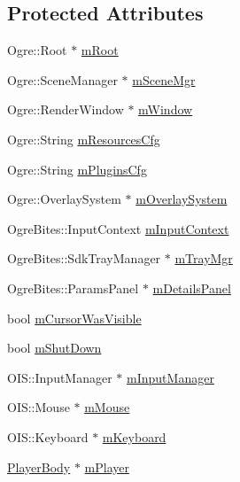 \subsection*{\-Protected \-Attributes}
\begin{DoxyCompactItemize}
\item 
\-Ogre\-::\-Root $\ast$ \hyperlink{classBaseApplication_add84ba707dc6c57e6283f214b1274110}{m\-Root}
\item 
\-Ogre\-::\-Scene\-Manager $\ast$ \hyperlink{classBaseApplication_a8a7684f4f9a57ed3089048ad1a913b2d}{m\-Scene\-Mgr}
\item 
\-Ogre\-::\-Render\-Window $\ast$ \hyperlink{classBaseApplication_ac5d8e9c81e036897bc82f81eff8c570f}{m\-Window}
\item 
\-Ogre\-::\-String \hyperlink{classBaseApplication_a765e0df01c141a16df3178ab4f17afe6}{m\-Resources\-Cfg}
\item 
\-Ogre\-::\-String \hyperlink{classBaseApplication_a04f2fe47fa164fd78d986dc0df70b7fb}{m\-Plugins\-Cfg}
\item 
\-Ogre\-::\-Overlay\-System $\ast$ \hyperlink{classBaseApplication_a17ccdacc654eff8ac0d09f025311fbb5}{m\-Overlay\-System}
\item 
\-Ogre\-Bites\-::\-Input\-Context \hyperlink{classBaseApplication_a7da63f46f2ccf2c6385723c11c03301f}{m\-Input\-Context}
\item 
\-Ogre\-Bites\-::\-Sdk\-Tray\-Manager $\ast$ \hyperlink{classBaseApplication_a7faa397f4f4861ee8c361a01e90b4416}{m\-Tray\-Mgr}
\item 
\-Ogre\-Bites\-::\-Params\-Panel $\ast$ \hyperlink{classBaseApplication_a6a11054ca61efdf558e0ff1b2de43a12}{m\-Details\-Panel}
\item 
bool \hyperlink{classBaseApplication_ac7e861799862cb645f1d78b170aef80d}{m\-Cursor\-Was\-Visible}
\item 
bool \hyperlink{classBaseApplication_a755f26d3a9915aaf830750d877e39d86}{m\-Shut\-Down}
\item 
\-O\-I\-S\-::\-Input\-Manager $\ast$ \hyperlink{classBaseApplication_abc9503c8462e225b5d0d55c952d9e4a9}{m\-Input\-Manager}
\item 
\-O\-I\-S\-::\-Mouse $\ast$ \hyperlink{classBaseApplication_add9b97fbe64da2814d3af113bac58c43}{m\-Mouse}
\item 
\-O\-I\-S\-::\-Keyboard $\ast$ \hyperlink{classBaseApplication_a9d6e19cf50c47379fbaae55bff28079c}{m\-Keyboard}
\item 
\hyperlink{classPlayerBody}{\-Player\-Body} $\ast$ \hyperlink{classBaseApplication_a741eec58ff4787a66ce1533517afe1b1}{m\-Player}

\end{DoxyCompactItemize}
